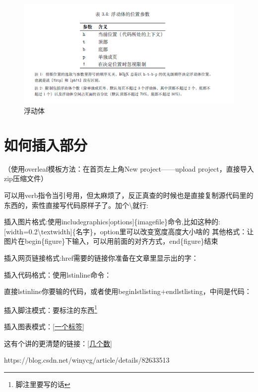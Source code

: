 \documentclass{article}
\begin{document}
\begin{itemize}
	\begin{figure}[htbp]
		\centering
		\includegraphics[width=\textwidth]{h.png}
		\caption{浮动体}
	\end{figure}


\end{itemize}




\section{如何插入部分}
（使用overleaf模板方法：在首页左上角New project——upload project，直接导入zip压缩文件）

可以用verb指令当引号用，但太麻烦了，反正真查的时候也是直接复制源代码里的东西的，索性直接写代码原样子了。加个\textbackslash 就行:

    插入图片格式:使用includegraphics[options]\{imagefile\}命令,比如这种的:[width=0.2\textbackslash textwidth]\{名字\}，option里可以改变宽度高度大小啥的
    其他格式：让图片在begin\{figure\}下输入，可以用前面的对齐方式，end\{figure\}结束  

    插入网页链接格式:href{需要的链接}{你准备在文章里显示出的字}：

    插入代码格式：使用lstinline命令：
    
    直接lstinline{你要输的代码}，或者使用begin{lstlisting}+end{lstlisting}，中间是代码：

    插入脚注模式：{要标注的东西\footnote{脚注里要写的话}}

    插入图表模式：\ref{一个标签}
    
    这有个讲的更清楚的链接：\ref{几个数}
    
    https://blog.csdn.net/winycg/article/details/82633513
\end{document}

